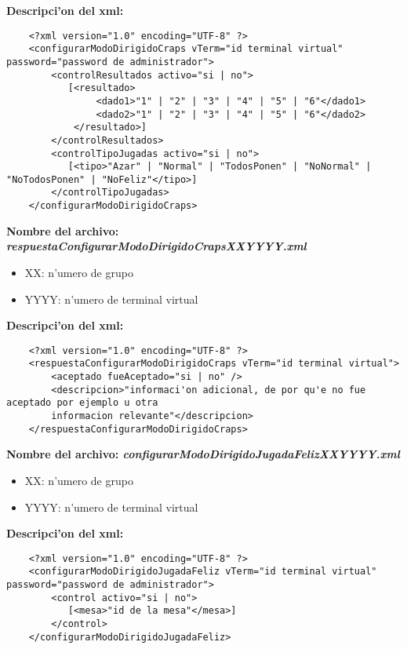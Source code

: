 \bf{Descripci'on del xml:}
\begin{verbatim}
    <?xml version="1.0" encoding="UTF-8" ?>
    <configurarModoDirigidoCraps vTerm="id terminal virtual" password="password de administrador">
        <controlResultados activo="si | no">
           [<resultado>
                <dado1>"1" | "2" | "3" | "4" | "5" | "6"</dado1>
                <dado2>"1" | "2" | "3" | "4" | "5" | "6"</dado2>
            </resultado>]
        </controlResultados>
        <controlTipoJugadas activo="si | no">
           [<tipo>"Azar" | "Normal" | "TodosPonen" | "NoNormal" | "NoTodosPonen" | "NoFeliz"</tipo>]
        </controlTipoJugadas>
    </configurarModoDirigidoCraps>
\end{verbatim}


\bf{Nombre del archivo:} \it{respuestaConfigurarModoDirigidoCrapsXXYYYY.xml}
\begin{itemize}
    \item{XX: n'umero de grupo}
    \item{YYYY: n'umero de terminal virtual}
\end{itemize}

\bf{Descripci'on del xml:}
\begin{verbatim}
    <?xml version="1.0" encoding="UTF-8" ?>
    <respuestaConfigurarModoDirigidoCraps vTerm="id terminal virtual">
        <aceptado fueAceptado="si | no" />
        <descripcion>"informaci'on adicional, de por qu'e no fue aceptado por ejemplo u otra
        informacion relevante"</descripcion>
    </respuestaConfigurarModoDirigidoCraps>
\end{verbatim}


\bf{Nombre del archivo:} \it{configurarModoDirigidoJugadaFelizXXYYYY.xml}
\begin{itemize}
    \item{XX: n'umero de grupo}
    \item{YYYY: n'umero de terminal virtual}
\end{itemize}


\bf{Descripci'on del xml:}
\begin{verbatim}
    <?xml version="1.0" encoding="UTF-8" ?>
    <configurarModoDirigidoJugadaFeliz vTerm="id terminal virtual" password="password de administrador">
        <control activo="si | no">
           [<mesa>"id de la mesa"</mesa>]
        </control>
    </configurarModoDirigidoJugadaFeliz>
\end{verbatim}


